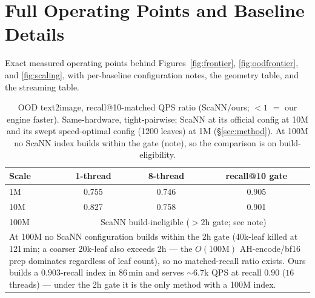 \documentclass{article}
\begin{document}
\appendix
\section{Full Operating Points and Baseline Details}
\label{app:tables}
Exact measured operating points behind Figures~\ref{fig:frontier}, \ref{fig:oodfrontier}, and \ref{fig:scaling}, with per-baseline configuration notes, the geometry table, and the streaming table.

\begin{table}[t]
\centering
\caption{OOD text2image, recall@10-matched QPS ratio (ScaNN$/$ours; $<1$ $=$ our
engine faster). Same-hardware, tight-pairwise; ScaNN at its official config at 10M
and its swept speed-optimal config (1200 leaves) at 1M (\S\ref{sec:method}).
At 100M no ScaNN index builds within the gate (note), so the comparison is on build-eligibility.}
\label{tab:main}
\vspace{3pt}
\begin{tabular}{lccc}
\toprule
Scale & 1-thread & 8-thread & recall@10 gate \\
\midrule
1M   & 0.755 & 0.746 & 0.905 \\
10M  & 0.827 & 0.758 & 0.901 \\
100M & \multicolumn{3}{c}{ScaNN build-ineligible ($>2$h gate; see note)} \\
\bottomrule
\multicolumn{4}{p{0.92\linewidth}}{\footnotesize At 100M no ScaNN configuration builds
within the 2h gate (40k-leaf killed at 121\,min; a coarser 20k-leaf also exceeds 2h ---
the $O(100\text{M})$ AH-encode/bf16 prep dominates regardless of leaf count), so no
matched-recall ratio exists. Ours builds a $0.903$-recall index in $86$\,min and serves
${\sim}6.7$k QPS at recall $0.90$ ($16$ threads) --- under the 2h gate it is the only
method with a 100M index.} \\
\end{tabular}
\end{table}
\end{document}
